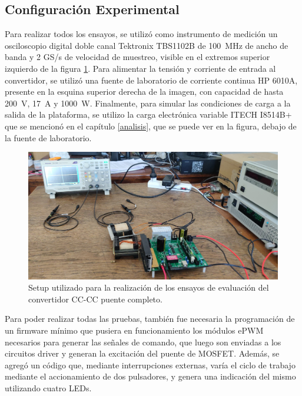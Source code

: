 \subsection{Configuración Experimental}

Para realizar todos los ensayos, se utilizó como instrumento de medición un osciloscopio digital doble canal Tektronix TBS1102B de \SI[]{100}{\mega\hertz} de ancho de banda y 2 GS/s de velocidad de muestreo, visible en el extremos superior izquierdo de la figura \ref{test_setup}. Para alimentar la tensión y corriente de entrada al convertidor, se utilizó una fuente de laboratorio de corriente continua HP 6010A, presente en la esquina superior derecha de la imagen, con capacidad de hasta \SI[]{200}{\volt}, \SI[]{17}{\ampere} y \SI[]{1000}{\watt}. Finalmente, para simular las condiciones de carga a la salida de la plataforma, se utilizo la carga electrónica variable ITECH I8514B+ que se mencionó en el capítulo \ref{analisis}, que se puede ver en la figura, debajo de la fuente de laboratorio.\\

\begin{figure}[h]
    \centering
    \includegraphics[scale=0.09]{Imagenes/Setup Ensayo.jpg}
    \caption{Setup utilizado para la realización de los ensayos de evaluación del convertidor CC-CC puente completo.}
    \label{test_setup}
\end{figure}

Para poder realizar todas las pruebas, también fue necesaria la programación de un firmware mínimo que pusiera en funcionamiento los módulos ePWM necesarios para generar las señales de comando, que luego son enviadas a los circuitos driver y generan la excitación del puente de MOSFET. Además, se agregó un código que, mediante interrupciones externas, varía el ciclo de trabajo mediante el accionamiento de dos pulsadores, y genera una indicación del mismo utilizando cuatro LEDs.\\

